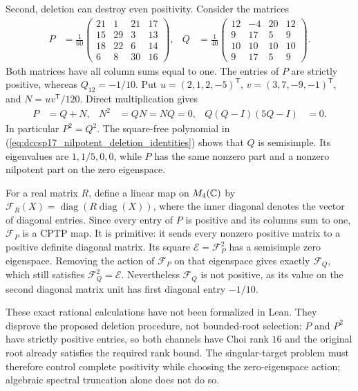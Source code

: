 \documentclass{article}
\begin{document}
Second, deletion can destroy even positivity. Consider the matrices
\begin{align}
 P&=\frac1{60}
 \begin{pmatrix}
 21&1&21&17\\15&29&3&13\\18&22&6&14\\6&8&30&16
 \end{pmatrix}, &
 Q&=\frac1{40}
 \begin{pmatrix}
 12&-4&20&12\\9&17&5&9\\10&10&10&10\\9&17&5&9
 \end{pmatrix}.
 \label{eq:dccsp17_nilpotent_deletion_matrices}
\end{align}
Both matrices have all column sums equal to one. The entries of $P$
are strictly positive, whereas $Q_{12}=-1/10$.
Put $u=(2,1,2,-5)^{\mathsf T}$, $v=(3,7,-9,-1)^{\mathsf T}$, and
$N=uv^{\mathsf T}/120$. Direct multiplication gives
\begin{align}
 P&=Q+N, & N^2&=QN=NQ=0, & Q(Q-I)(5Q-I)&=0.
 \label{eq:dccsp17_nilpotent_deletion_identities}
\end{align}
In particular $P^2=Q^2$. The square-free polynomial in
(\ref{eq:dccsp17_nilpotent_deletion_identities}) shows that $Q$ is
semisimple. Its eigenvalues are $1,1/5,0,0$, while $P$ has the same
nonzero part and a nonzero nilpotent part on the zero eigenspace.

For a real matrix $R$, define a linear map on $M_4(\mathbb{C})$ by
$\mathcal F_R(X)=\operatorname{diag}(R\operatorname{diag}(X))$, where the
inner diagonal denotes the vector of diagonal entries. Since every entry
of $P$ is positive and its columns sum to one, $\mathcal F_P$ is a CPTP
map. It is primitive: it sends every nonzero positive matrix to a positive
definite diagonal matrix. Its square $\mathcal E=\mathcal F_P^2$ has a
semisimple zero eigenspace. Removing the action of $\mathcal F_P$ on that
eigenspace gives exactly $\mathcal F_Q$, which still satisfies
$\mathcal F_Q^2=\mathcal E$. Nevertheless $\mathcal F_Q$ is not positive,
as its value on the second diagonal matrix unit has first diagonal entry
$-1/10$.

These exact rational calculations have not been formalized in Lean.
They disprove the proposed deletion procedure, not bounded-root selection:
$P$ and $P^2$ have strictly positive entries, so both channels have Choi
rank $16$ and the original root already satisfies the required rank bound.
The singular-target problem must therefore control complete positivity
while choosing the zero-eigenspace action; algebraic spectral truncation
alone does not do so.
\end{document}
